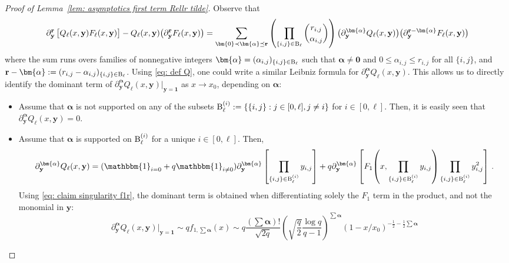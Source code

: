 \documentclass{article}
\theoremstyle{remark}
\newcommand{\pairs}{{\rm B}}
\newcommand{\by}{{\mathbf{y}}}
\newcommand{\br}{{\mathbf{r}}}
\newcommand{\One}[1]{\mathbbm{1}_{#1}}
\begin{document}
\begin{proof}[Proof of Lemma~\ref{lem: asymptotics first term Rellr tilde}]
Observe that
\begin{equation}\label{eq: Leibniz formula for product Qell Fell}
    \partial_\by^\br \left[\big. Q_\ell(x,\by) F_\ell(x,\by) \right]
    - Q_\ell(x,\by) \big( \partial_\by^\br F_\ell(x,\by) \big)
    = \sum_{\bm{0} \prec \bm{\alpha} \preceq \br} 
    \left( \prod_{\{i,j\}\in \pairs_\ell} \binom{r_{i,j}}{\alpha_{i,j}} \right) 
     \big(\partial_\by^{\bm{\alpha}} Q_\ell(x,\by) \big) \big( \partial_\by^{\br-\bm{\alpha}} F_\ell(x,\by) \big)
\end{equation}
where the sum runs overs families of nonnegative integers $\bm{\alpha} = (\alpha_{i,j})_{\{i,j\}\in \pairs_\ell}$ such that $\bm{\alpha}\ne \bm{0}$ and $0\le \alpha_{i,j}\le r_{i,j}$ for all $\{i,j\}$, and $\br-\bm{\alpha} := (r_{i,j} - \alpha_{i,j})_{\{i,j\}\in \pairs_\ell}$.
Using \eqref{eq: def Q}, one could write a similar Leibniz formula for $\partial_\by^{\bm{\alpha}} Q_\ell(x,\by)$.
This allows us to directly identify the dominant term of $\partial_\by^{\bm{\alpha}} Q_\ell(x,\by) \vert_{\by=\bm{1}}$ as $x\to x_0$, depending on $\bm{\alpha}$:
\begin{itemize}
    \item Assume that $\bm{\alpha}$ is not supported on any of the subsets $\pairs_\ell^{(i)} := \{ \{i,j\} : j\in[0,\ell], j\ne i\}$ for $i\in [0,\ell]$.
    Then, it is easily seen that $\partial_\by^{\bm{\alpha}} Q_\ell(x,\by) = 0$.
    \item Assume that $\bm{\alpha}$ is supported on $\pairs_\ell^{(i)}$ for a unique $i\in[0,\ell]$.
    Then,
    \[
        \partial_\by^{\bm{\alpha}} Q_\ell(x,\by)
        = (\One{i=0} + q\One{i\ne0}) \partial_\by^{\bm{\alpha}} \left[ \prod_{\{i,j\}\in \pairs_\ell^{(i)}} y_{i,j} \right]
        + q \partial_\by^{\bm{\alpha}} \left[ F_1{\left(x, \prod_{\{i,j\}\in \pairs_\ell^{(i)}} y_{i,j}\right)} \prod_{\{i,j\}\in \pairs_\ell^{(i)}} y_{i,j}^{2
        } \right] \,.
    \]
    Using \eqref{eq: claim singularity f1r}, the dominant term is obtained when differentiating solely the $F_1$ term in the product, and not the monomial in $\by$:
    \begin{equation*}
        \partial_\by^{\bm{\alpha}} Q_\ell(x,\by) \vert_{\by=\bm{1}}
        \sim q f_{1,\sum\bm{\alpha}}(x)
        \sim q \frac{(\sum\bm{\alpha})!}{\sqrt{2q}} \left( \sqrt{\frac{q}{2}} \frac{\log q}{q-1} \right)^{\sum\bm{\alpha}} \left( 1 - {x}/{x_0} \right)^{-\frac12-\frac12\sum\bm{\alpha}}

\end{equation*}
\end{itemize}
\end{proof}
\end{document}
